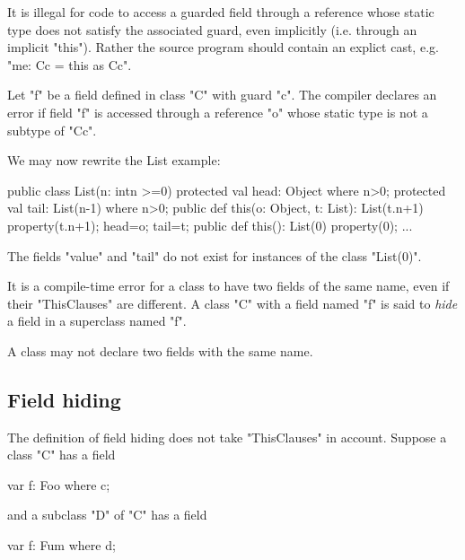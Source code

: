 It is illegal for code to access a guarded field through a reference
whose static type does not satisfy the associated guard, even
implicitly (i.e.{} through an implicit \xcd"this"). Rather the source
program should contain an explict cast, e.g.{} \xcd"me: C{c} = this as C{c}".

\begin{staticrule*}
Let \xcd"f" be a field defined in class
\xcd"C" with guard \xcd"c".  The compiler declares an error if
field \xcd"f" is accessed through a reference \xcd"o" whose static
type is not a subtype of \xcd"C{c}".
\end{staticrule*}

\begin{example}

We may now rewrite the List example:
\begin{xten}
public class List(n: int{n >=0}) {
  protected val head: Object where n>0;
  protected val tail: List(n-1) where n>0;
  public def this(o: Object, t: List): List(t.n+1) {
     property(t.n+1);
     head=o;
     tail=t;
  }
  public def this(): List(0) {
     property(0);
  }
  ...
}
\end{xten}

The fields \xcd"value" and \xcd"tail" do not exist for instances of the class
\xcd"List(0)".
\end{example}

It is a compile-time error for a class to have two fields of the same
name, even if their \xcd"ThisClauses" are different. A class \xcd"C" with a field
named \xcd"f" is said to {\em hide} a field in a superclass named \xcd"f".

\begin{staticrule*}
     A class may not declare two fields with the same name.
\end{staticrule*}

\subsection{Field hiding}

The definition of field hiding does not take \xcd"ThisClauses" in
account. Suppose a class \xcd"C" has a field

\begin{xten}
var f: Foo where c;
\end{xten}
\noindent and a subclass \xcd"D" of \xcd"C" has a field
\begin{xten}
var f: Fum where d;
\end{xten}

